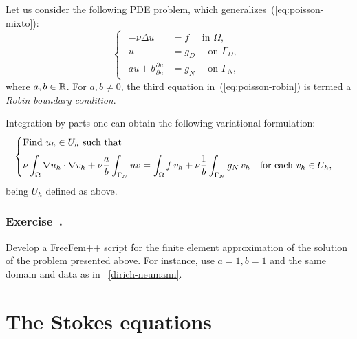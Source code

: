 \documentclass[12pt]{article}
\newcounter{exercise}
\newenvironment{exercise}{%
  \stepcounter{exercise}
  \subsubsection*{Exercise~\theexercise.}}
{}
\begin{document}
Let us consider the following PDE problem, which generalizes~(\ref{eq:poisson-mixto}):
\begin{equation}
  \label{eq:poisson-robin}
  \begin{cases}
    \begin{aligned}
      -\nu\Delta u &= f \quad \text{ in } \Omega, \\
      u &= g_D \quad \text{ on } \Gamma_D, \\
      au + b \frac{\partial u}{\partial n} &= g_N \quad \text{ on } \Gamma_N,
    \end{aligned}
  \end{cases}
\end{equation}
where $a,b\in{\mathbb R}$. For $a,b\neq 0$, the third equation
in~(\ref{eq:poisson-robin}) is termed a \textit{Robin boundary
  condition}.

Integration by parts one can obtain the following variational formulation:
\begin{equation*}
  \begin{cases}
    \text{Find $u_h\in U_{h}$ such that}
    \\\noalign{\medskip}
    \begin{aligned}
      \nu\int_\Omega \nabla u_h \cdot \nabla v_h
      + \nu\frac a b \int_{\Gamma_N} u v
      = \int_\Omega f\, v_h
      + \nu \frac 1b \int_{\Gamma_N} g_N\, v_h
      \quad\text{for each } v_h\in U_{h},
    \end{aligned}
  \end{cases}
\end{equation*}
being $U_h$ defined as above.

\begin{exercise}
  Develop a FreeFem++ script for the finite element approximation of
  the solution of the problem presented above. For instance, use
  $a=1, b=1$ and the same domain and data as in
  \lstlistingname~\ref{dirich-neumann}.
\end{exercise}

\section{The Stokes equations}
\label{sec:stokes}
\end{document}

